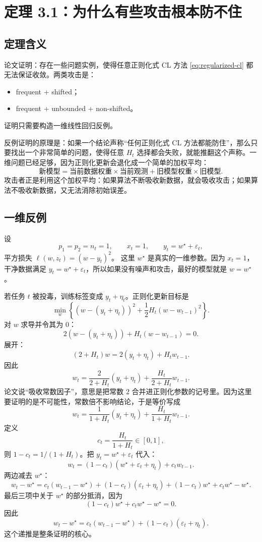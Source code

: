 \documentclass[UTF8,fontset=none,11pt]{ctexart}
\theoremstyle{cnstyle}
\begin{document}
\section{定理 3.1：为什么有些攻击根本防不住}

\subsection{定理含义}

论文证明：存在一些问题实例，使得任意正则化式 CL 方法 \eqref{eq:regularized-cl} 都无法保证收敛。两类攻击是：
\begin{itemize}
  \item frequent + shifted；
  \item frequent + unbounded + non-shifted。
\end{itemize}
证明只需要构造一维线性回归反例。

反例证明的原理是：如果一个结论声称“任何正则化式 CL 方法都能防住”，那么只要找出一个非常简单的问题，使得任意 \(H_t\) 选择都会失败，就能推翻这个声称。一维问题已经足够，因为正则化更新会退化成一个简单的加权平均：
\[
  \text{新模型}
  =
  \text{当前数据权重}\times\text{当前观测}
  +
  \text{旧模型权重}\times\text{旧模型}.
\]
攻击者正是利用这个加权平均：如果算法不断吸收新数据，就会吸收攻击；如果算法不吸收新数据，又无法消除初始误差。

\subsection{一维反例}

设
\[
  p_1=p_2=n_t=1,\qquad x_t=1,\qquad y_t=w^\star+\varepsilon_t,
\]
平方损失 \(\ell(w,z_t)=(w-y_t)^2\)。
这里 \(w^\star\) 是真实的一维参数。因为 \(x_t=1\)，干净数据满足 \(y_t=w^\star+\varepsilon_t\)，所以如果没有噪声和攻击，最好的模型就是 \(w=w^\star\)。

若任务 \(t\) 被投毒，训练标签变成 \(y_t+\eta_t\)。正则化更新目标是
\[
  \min_w
  \left\{
  (w-(y_t+\eta_t))^2
  +\frac12H_t(w-w_{t-1})^2
  \right\}.
\]
对 \(w\) 求导并令其为 0：
\[
  2(w-(y_t+\eta_t))+H_t(w-w_{t-1})=0.
\]
展开：
\[
  (2+H_t)w=2(y_t+\eta_t)+H_tw_{t-1}.
\]
因此
\[
  w_t
  =
  \frac{2}{2+H_t}(y_t+\eta_t)
  +
  \frac{H_t}{2+H_t}w_{t-1}.
\]
论文说“吸收常数因子”，意思是把常数 \(2\) 合并进正则化参数的记号里。因为这里要证明的是不可能性，常数倍不影响结论，于是等价写成
\[
  w_t
  =
  \frac{1}{1+H_t}(y_t+\eta_t)
  +
  \frac{H_t}{1+H_t}w_{t-1}.
\]
定义
\[
  c_t=\frac{H_t}{1+H_t}\in[0,1],
\]
则 \(1-c_t=1/(1+H_t)\)。把 \(y_t=w^\star+\varepsilon_t\) 代入：
\[
  w_t
  =
  (1-c_t)(w^\star+\varepsilon_t+\eta_t)+c_tw_{t-1}.
\]
两边减去 \(w^\star\)：
\[
  w_t-w^\star
  =
  c_t(w_{t-1}-w^\star)
  +(1-c_t)(\varepsilon_t+\eta_t)
  +(1-c_t)w^\star+c_tw^\star-w^\star.
\]
最后三项中关于 \(w^\star\) 的部分抵消，因为
\[
  (1-c_t)w^\star+c_tw^\star-w^\star=0.
\]
因此
\begin{equation}
  w_t-w^\star
  =
  c_t(w_{t-1}-w^\star)
  +(1-c_t)(\varepsilon_t+\eta_t).
  \label{eq:scalar-recursion}
\end{equation}
这个递推是整条证明的核心。
\end{document}
